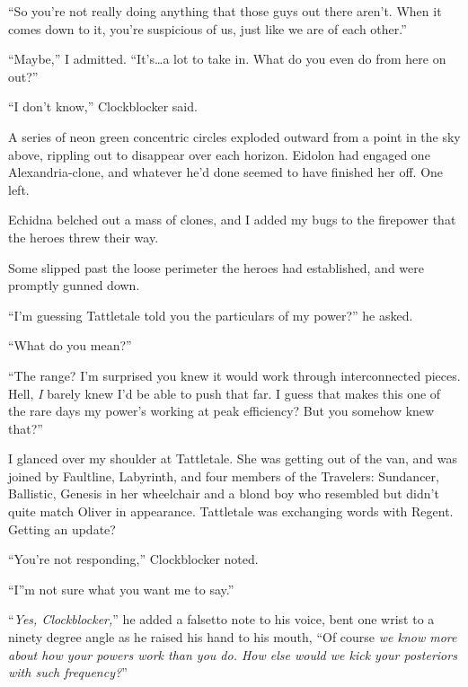 ``So you're not really doing anything that those guys out there aren't.  When it comes down to it, you're suspicious of us, just like we are of each other.''



``Maybe,'' I admitted.  ``It's\ldots a lot to take in.  What do you even do from here on out?''



``I don't know,'' Clockblocker said.



A series of neon green concentric circles exploded outward from a point in the sky above, rippling out to disappear over each horizon.  Eidolon had engaged one Alexandria-clone, and whatever he'd done seemed to have finished her off.  One left.



Echidna belched out a mass of clones, and I added my bugs to the firepower that the heroes threw their way.



Some slipped past the loose perimeter the heroes had established, and were promptly gunned down.



``I'm guessing Tattletale told you the particulars of my power?'' he asked.



``What do you mean?''



``The range?  I'm surprised you knew it would work through interconnected pieces.  Hell, \emph{I} barely knew I'd be able to push that far.  I guess that makes this one of the rare days my power's working at peak efficiency?  But you somehow knew that?''



I glanced over my shoulder at Tattletale.  She was getting out of the van, and was joined by Faultline, Labyrinth, and four members of the Travelers: Sundancer, Ballistic, Genesis in her wheelchair and a blond boy who resembled but didn't quite match Oliver in appearance.  Tattletale was exchanging words with Regent.  Getting an update?



``You're not responding,'' Clockblocker noted.



``I''m not sure what you want me to say.''



``\emph{Yes, Clockblocker,}'' he added a falsetto note to his voice, bent one wrist to a ninety degree angle as he raised his hand to his mouth, ``Of course \emph{we know more about how your powers work than you do.  How else would we kick your posteriors with such frequency?}''



